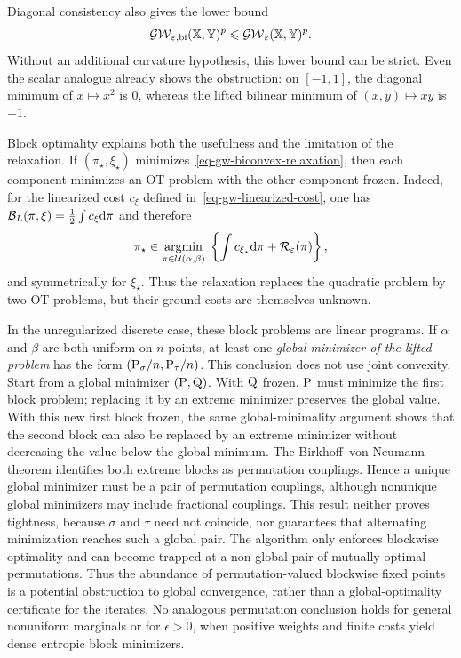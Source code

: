 Diagonal consistency also gives the lower bound
\begin{equation}\label{eq-gw-biconvex-lower-bound}
	\GW_{\epsilon,\mathrm{bi}}(\XX,\YY)^p
	\leq
	\GW_\epsilon(\XX,\YY)^p.
\end{equation}
Without an additional curvature hypothesis, this lower bound can be strict. Even the scalar analogue already shows the obstruction: on $[-1,1]$, the diagonal minimum of $x\mapsto x^2$ is $0$, whereas the lifted bilinear minimum of $(x,y)\mapsto xy$ is $-1$.

Block optimality explains both the usefulness and the limitation of the relaxation. If $(\pi_\star,\xi_\star)$ minimizes~\eqref{eq-gw-biconvex-relaxation}, then each component minimizes an OT problem with the other component frozen. Indeed, for the linearized cost $c_\xi$ defined in~\eqref{eq-gw-linearized-cost}, one has $\mathcal B_L(\pi,\xi)=\frac12\int c_\xi\d\pi$ and therefore
\[
	\pi_\star\in\uargmin{\pi\in\Couplings(\alpha,\beta)}
	\left\{\int c_{\xi_\star}\d\pi+\mathcal R_\epsilon(\pi)\right\},
\]
and symmetrically for $\xi_\star$. Thus the relaxation replaces the quadratic problem by two OT problems, but their ground costs are themselves unknown.

In the unregularized discrete case, these block problems are linear programs. If $\alpha$ and $\beta$ are both uniform on $n$ points, at least one \emph{global minimizer of the lifted problem} has the form $(\P_\sigma/n,\P_\tau/n)$. This conclusion does not use joint convexity. Start from a global minimizer $(\P,\Q)$. With $\Q$ frozen, $\P$ must minimize the first block problem; replacing it by an extreme minimizer preserves the global value. With this new first block frozen, the same global-minimality argument shows that the second block can also be replaced by an extreme minimizer without decreasing the value below the global minimum. The Birkhoff--von Neumann theorem identifies both extreme blocks as permutation couplings. Hence a unique global minimizer must be a pair of permutation couplings, although nonunique global minimizers may include fractional couplings. This result neither proves tightness, because $\sigma$ and $\tau$ need not coincide, nor guarantees that alternating minimization reaches such a global pair. The algorithm only enforces blockwise optimality and can become trapped at a non-global pair of mutually optimal permutations. Thus the abundance of permutation-valued blockwise fixed points is a potential obstruction to global convergence, rather than a global-optimality certificate for the iterates. No analogous permutation conclusion holds for general nonuniform marginals or for $\epsilon>0$, when positive weights and finite costs yield dense entropic block minimizers.


